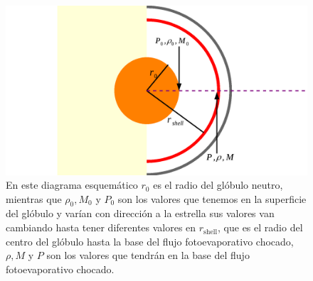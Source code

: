 \documentclass{book}
\begin{document}
\begin{figure}[htb]
    \centering \includegraphics[width=\textwidth]{imagenes_corregidas/Arreglo 02.pdf}
    \caption{En este diagrama esquemático $r_0$ es el radio del glóbulo neutro, mientras que $\rho_0,M_0$ y $P_0$ son los valores que tenemos en la superficie del glóbulo y varían con dirección a la estrella sus valores van cambiando hasta tener diferentes valores en $r_\mathrm{shell}$, que es el radio del centro del glóbulo hasta la base del flujo fotoevaporativo chocado, $\rho,M$ y $P$ son los valores que tendrán en la base del flujo fotoevaporativo chocado.}
    \label{fig:parameters}
\end{figure}
\end{document}
